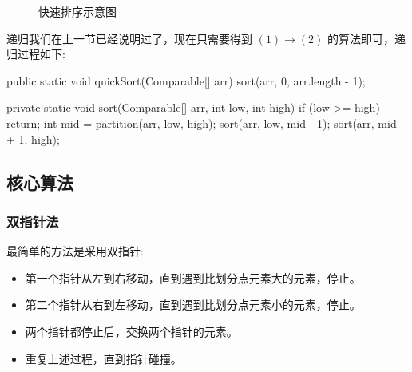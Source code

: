 \begin{figure}[H]
  \caption{快速排序示意图}
  \label{fig:快速排序示意图}
\end{figure}

递归我们在上一节已经说明过了，现在只需要得到 $(1) \rightarrow (2)$ 的算法即可，递归过程如下:

\begin{Java}
public static void quickSort(Comparable[] arr) {
    sort(arr, 0, arr.length - 1);
}

private static void sort(Comparable[] arr, int low, int high) {
    if (low >= high)
        return;
    int mid = partition(arr, low, high);
    sort(arr, low, mid - 1);
    sort(arr, mid + 1, high);
}
\end{Java}

\subsection{核心算法}

\subsubsection{双指针法}

最简单的方法是采用双指针:
\begin{itemize}
  \item 第一个指针从左到右移动，直到遇到比划分点元素大的元素，停止。
  \item 第二个指针从右到左移动，直到遇到比划分点元素小的元素，停止。
  \item 两个指针都停止后，交换两个指针的元素。
  \item 重复上述过程，直到指针碰撞。
\end{itemize}

